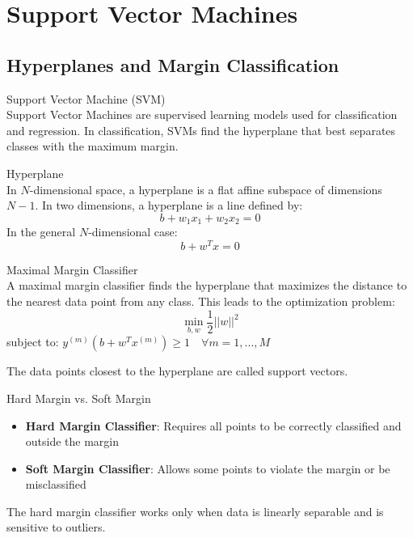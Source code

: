 \section{Support Vector Machines}

\subsection{Hyperplanes and Margin Classification}

\begin{definition}{Support Vector Machine (SVM)}\\
Support Vector Machines are supervised learning models used for classification and regression. In classification, SVMs find the hyperplane that best separates classes with the maximum margin.
\end{definition}

\begin{definition}{Hyperplane}\\
In $N$-dimensional space, a hyperplane is a flat affine subspace of dimensions $N-1$. In two dimensions, a hyperplane is a line defined by:
\[b + w_1 x_1 + w_2 x_2 = 0\]
In the general $N$-dimensional case:
\[b + w^T x = 0\]
\end{definition}

\begin{definition}{Maximal Margin Classifier}\\
A maximal margin classifier finds the hyperplane that maximizes the distance to the nearest data point from any class. This leads to the optimization problem:
\[\min_{b,w} \frac{1}{2}||w||^2\]
subject to: $y^{(m)}(b + w^T x^{(m)}) \geq 1 \quad \forall m = 1, ..., M$

The data points closest to the hyperplane are called support vectors.
\end{definition}

\begin{concept}{Hard Margin vs. Soft Margin}\\
\begin{itemize}
    \item \textbf{Hard Margin Classifier}: Requires all points to be correctly classified and outside the margin
    \item \textbf{Soft Margin Classifier}: Allows some points to violate the margin or be misclassified
\end{itemize}
The hard margin classifier works only when data is linearly separable and is sensitive to outliers.
\end{concept}

